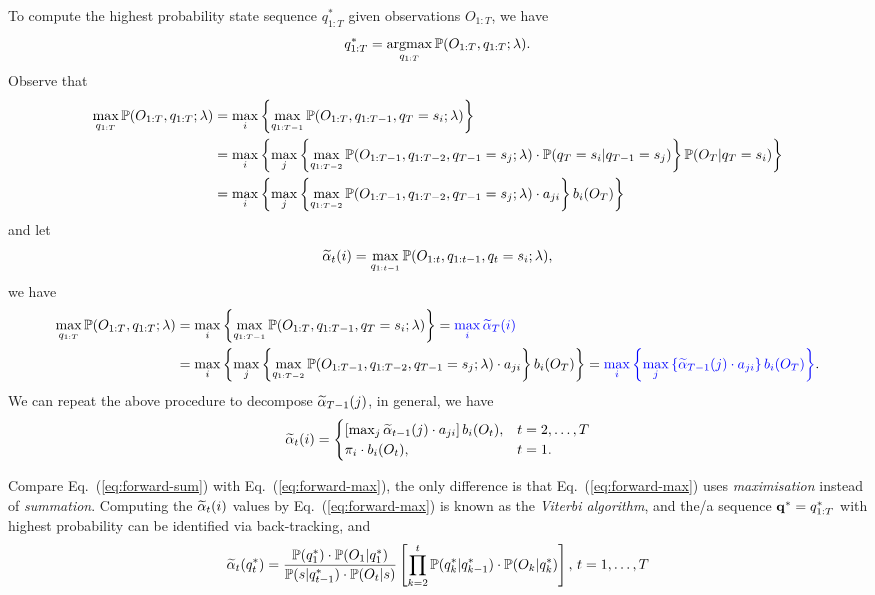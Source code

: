 To compute the highest probability state sequence $q_{1:T}^*$ given observations $O_{1:T}$, we have
\begin{equation*}
q_{1:T}^* = \operatorname*{argmax}_{q_{1:T}} \mathbb{P}(O_{1:T}, q_{1:T} ;\lambda).
\end{equation*}
Observe that 
\begin{align*}
\max_{q_{1:T}} \mathbb{P}(O_{1:T}, q_{1:T} ;\lambda) 
&= \max_{i} \left\{ \max_{q_{1:T-1}} \mathbb{P}(O_{1:T}, q_{1:T-1}, q_T = s_i ;\lambda) \right\} \\
&= \max_{i} \left\{ \max_{j} \left\{ \max_{q_{1:T-2}} \mathbb{P}(O_{1:T-1}, q_{1:T-2}, q_{T-1} = s_j ;\lambda) \cdot 
   \mathbb{P}(q_T = s_i |q_{T-1} = s_j) \right\} \mathbb{P}(O_T |q_T = s_i) \right\} \\
&= \max_{i} \left\{ \max_{j} \left\{ \max_{q_{1:T-2}} \mathbb{P}(O_{1:T-1}, q_{1:T-2}, q_{T-1} = s_j ;\lambda) \cdot a_{ji} \right\} b_i(O_T) \right\}
\end{align*}
and let 
\begin{equation}
\label{eq:alphat}
\widetilde{\alpha}_{t}(i) = \max_{q_{1:t-1}} \mathbb{P}(O_{1:t}, q_{1:t-1}, q_t = s_i ;\lambda),
\end{equation}
we have
\begin{alignat}{2}
\max_{q_{1:T}} \mathbb{P}(O_{1:T}, q_{1:T} ;\lambda) 
&= \max_{i} \left\{ \max_{q_{1:T-1}} \mathbb{P}(O_{1:T}, q_{1:T-1}, q_T = s_i ;\lambda) \right\} 
 = {\color{blue}{\max_{i} \widetilde{\alpha}_{T}(i)}} \label{eq:max-forward} \\
&= \max_{i} \left\{ \max_{j} \left\{ \max_{q_{1:T-2}} \mathbb{P}(O_{1:T-1}, q_{1:T-2}, q_{T-1} = s_j ;\lambda) \cdot a_{ji} \right\} b_i(O_T) \right\}
 = {\color{blue}{\max_{i} \left\{ \max_{j} \left\{ \widetilde{\alpha}_{T-1}(j) \cdot a_{ji} \right\} b_i(O_T) \right\}}}. \nonumber
\end{alignat}
We can repeat the above procedure to decompose $\widetilde{\alpha}_{T-1}(j)$, in general, we have
\begin{equation}
\label{eq:forward-max}
\widetilde{\alpha}_t(i) = \begin{cases}
                \left[ \max_{j} \widetilde{\alpha}_{t-1}(j) \cdot a_{ji} \right] b_i(O_t), & t=2,\dots,T \\
                \pi_i \cdot b_i(O_t), & t=1.
               \end{cases}
\end{equation}

Compare Eq.~(\ref{eq:forward-sum}) with Eq.~(\ref{eq:forward-max}), 
the only difference is that Eq.~(\ref{eq:forward-max}) uses \emph{maximisation} instead of \emph{summation}.
Computing the $\widetilde{\alpha}_t(i)$ values by Eq.~(\ref{eq:forward-max}) is known as the \emph{Viterbi algorithm}, 
and the/a sequence $\mathbf{q}^* = q_{1:T}^*$ with highest probability can be identified via back-tracking, and
\begin{equation}
\label{eq:alpha-sum}
\widetilde{\alpha}_t(q_t^*) = \frac{\mathbb{P}(q_1^*) \cdot \mathbb{P}(O_1 |q_1^*)} {\mathbb{P}(s |q_{t-1}^*) \cdot \mathbb{P}(O_t |s)} \left[ \prod_{k=2}^t \mathbb{P}(q_{k}^* |q_{k-1}^*) \cdot \mathbb{P}(O_{k} |q_{k}^*) \right], \, t = 1,\dots,T
\end{equation}

